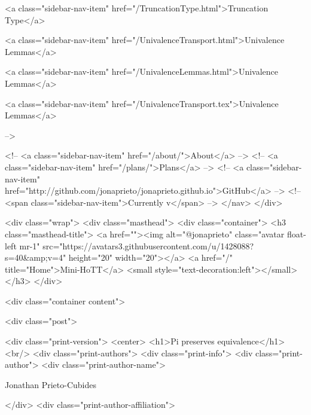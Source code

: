       
    
      
        
          <a class="sidebar-nav-item" href="/TruncationType.html">Truncation Type</a>
        
      
    
      
        
          <a class="sidebar-nav-item" href="/UnivalenceTransport.html">Univalence Lemmas</a>
        
      
    
      
        
          <a class="sidebar-nav-item" href="/UnivalenceLemmas.html">Univalence Lemmas</a>
        
      
    
      
        
          <a class="sidebar-nav-item" href="/UnivalenceTransport.tex">Univalence Lemmas</a>
        
      
     -->

    <!-- <a class="sidebar-nav-item" href="/about/">About</a> -->
    <!-- <a class="sidebar-nav-item" href="/plans/">Plans</a> -->
    <!-- <a class="sidebar-nav-item" href="http://github.com/jonaprieto/jonaprieto.github.io">GitHub</a> -->
    <!-- <span class="sidebar-nav-item">Currently v</span> -->
  </nav>
</div>

    <div class="wrap">
      <div class="masthead">
        <div class="container">
          <h3 class="masthead-title">
            <a href=""><img alt="@jonaprieto" class="avatar float-left mr-1" src="https://avatars3.githubusercontent.com/u/1428088?s=40&amp;v=4" height="20" width="20"></a>
            <a href="/" title="Home">Mini-HoTT</a>
            <small style="text-decoration:left"></small>
          </h3>
        </div>
      
      <div class="container content">
        







<div class="post">

  <div class="print-version">
    <center>
      <h1>Pi preserves equivalence</h1><br/>
        <div class="print-authors">
          <div class="print-info">
            <div class="print-author">
              <div class="print-author-name">
                
                  Jonathan Prieto-Cubides
                
              </div>
              <div class="print-author-affiliation">
                
